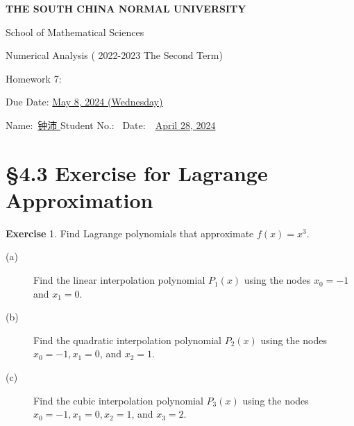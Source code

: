 \documentclass[UTF8,12pt,hyperref]{ctexart}
\makeatletter
\newenvironment{exercise}[1][{\color{blue}\bf Exercise}]%
{%
 \begin{center}   \begin{lrbox}{\@tempboxa}%
    \begin{minipage}{\textwidth}%
  {\color{blue}\bfseries
#1}   }{%
    \end{minipage}%
    \end{lrbox}
    \colorbox{green}{\noindent\usebox{\@tempboxa}} \end{center}  
}
\makeatother
\begin{document}

\begin{center}
{\bf  THE SOUTH CHINA NORMAL UNIVERSITY\vspace{0.08cm}

School of Mathematical Sciences\vspace{0.08cm}
 
Numerical Analysis ( 2022-2023 The Second Term) \vspace{0.18cm}

{\Large Homework 7: }\vspace{0.18cm}

Due Date: \underline{May 8, 2024 (Wednesday)} }
\end{center}\vspace{-0.16cm}

\begin{center}
  Name:\ \underline{\qquad 钟沛 \hspace{1cm}}\hspace{0.298cm}  
  Student No.:\ \underline{\hspace{1cm}} 
%
Date:\ \ \underline{April 28, 2024} 
 \end{center}
 
 

\section*{\S 4.3 Exercise for Lagrange Approximation}

  
\begin{exercise}1.\qquad
  Find Lagrange polynomials that approximate $f (x) = x^3$. 
\begin{description}
\item[(a)] Find the linear interpolation polynomial $P_1(x)$ using the nodes $x_0 = - 1$ and $x_1=0$. 
\item[(b)] Find the quadratic interpolation polynomial $P_2(x)$ using the nodes $x_0 = - 1, x_1=0$, and $x_2=1$. 
\item[(c)] Find the cubic interpolation polynomial $P_3(x)$ using the nodes $x_0 = - 1, x_1=0, x_2=1$, and $x_3=2$.
\end{description}
\end{exercise}   
  
\end{document}
